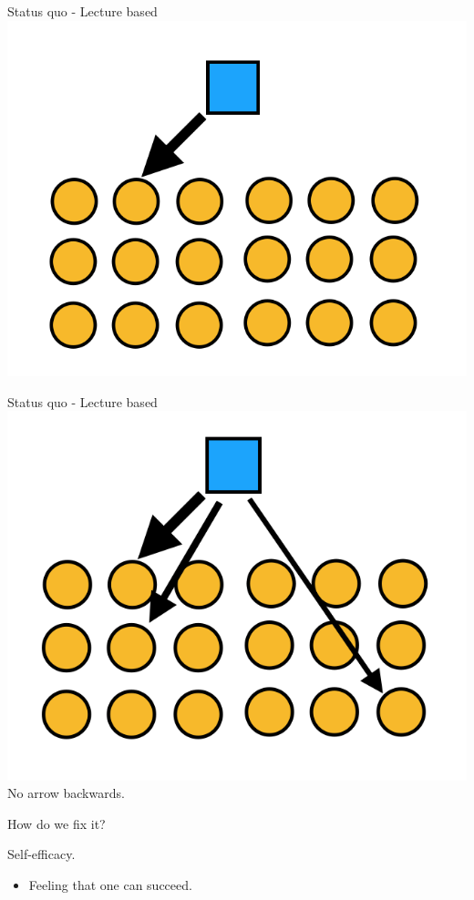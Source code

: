 \documentclass{beamer}
\begin{document}
\begin{frame}{Status quo - Lecture based}
  \centering
    \includegraphics[scale=0.5]{lecturestyle3}
\end{frame}
\begin{frame}{Status quo - Lecture based}
  \centering
    \includegraphics[scale=0.5]{lecturestyle2}\\
    \pause No arrow backwards.
\end{frame}
\begin{frame}
  How do we fix it?
\end{frame}
\begin{frame}
  Self-efficacy.\pause
  \begin{itemize}
    \item Feeling that one can succeed.
  \end{itemize}
\end{frame}
\end{document}
